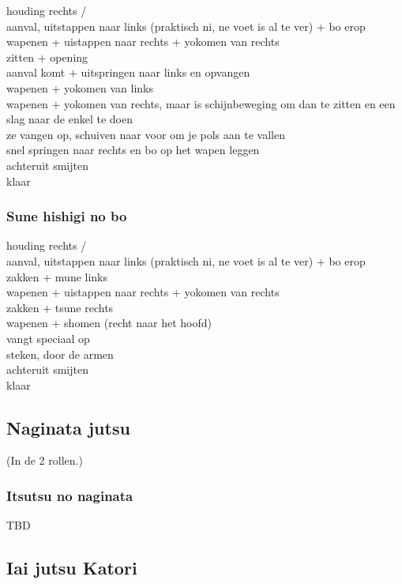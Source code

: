 houding rechts /\\
aanval, uitstappen naar links (praktisch ni, ne voet is al te ver) + bo erop\\
wapenen + uistappen naar rechts + yokomen van rechts\\
zitten + opening\\
aanval komt + uitspringen naar links en opvangen\\
wapenen + yokomen van links\\
wapenen + yokomen van rechts, maar is schijnbeweging om dan te zitten en een slag naar de enkel te doen\\
ze vangen op, schuiven naar voor om je pols aan te vallen\\
snel springen naar rechts en bo op het wapen leggen\\
achteruit smijten\\
klaar

\subsubsection{Sune hishigi no bo}

houding rechts /\\
aanval, uitstappen naar links (praktisch ni, ne voet is al te ver) + bo erop\\
zakken + mune links\\
wapenen + uistappen naar rechts + yokomen van rechts\\
zakken + tsune rechts\\
wapenen + shomen (recht naar het hoofd)\\
vangt speciaal op\\
steken, door de armen\\
achteruit smijten\\
klaar

\subsection{Naginata jutsu}
(In de 2 rollen.)

\subsubsection{Itsutsu no naginata}

TBD

\subsection{Iai jutsu Katori}

